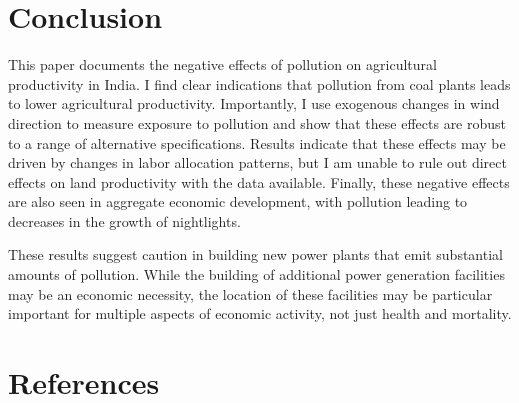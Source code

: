 \documentclass[
]{article}
\begin{document}
\hypertarget{conclusion}{%
\section{\texorpdfstring{Conclusion \label{conclusion}}{Conclusion }}\label{conclusion}}

This paper documents the negative effects of pollution on agricultural productivity in India. I find clear indications that pollution from coal plants leads to lower agricultural productivity. Importantly, I use exogenous changes in wind direction to measure exposure to pollution and show that these effects are robust to a range of alternative specifications. Results indicate that these effects may be driven by changes in labor allocation patterns, but I am unable to rule out direct effects on land productivity with the data available. Finally, these negative effects are also seen in aggregate economic development, with pollution leading to decreases in the growth of nightlights.

These results suggest caution in building new power plants that emit substantial amounts of pollution. While the building of additional power generation facilities may be an economic necessity, the location of these facilities may be particular important for multiple aspects of economic activity, not just health and mortality.

\FloatBarrier
\newpage
\singlespacing

\hypertarget{references}{%
\section*{References}\label{references}}
\end{document}
